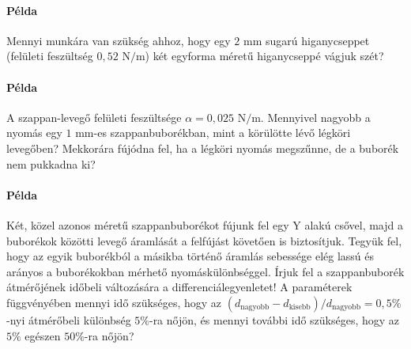 \documentclass[12pt,a4paper]{scrartcl}
\begin{document}
\paragraph{Példa}
Mennyi munkára van szükség ahhoz, hogy egy $2\text{ mm}$ sugarú higanycseppet (felületi feszültség $0{,}52\text{ N}/\text{m}$) két egyforma méretű higanycseppé vágjuk szét?

\paragraph{Példa}
A szappan-levegő felületi feszültsége $\alpha = 0{,}025\text{ N}/\text{m}$. Mennyivel nagyobb a nyomás egy $1\text{ mm}$-es szappanbuborékban, mint a körülötte lévő légköri levegőben? Mekkorára fújódna fel, ha a légköri nyomás megszűnne, de a buborék nem pukkadna ki?

\paragraph{Példa}
Két, közel azonos méretű szappanbuborékot fújunk fel egy Y alakú csővel, majd a buborékok közötti levegő áramlását a felfújást követően is biztosítjuk. Tegyük fel, hogy az egyik buborékból a másikba történő áramlás sebessége elég lassú és arányos a buborékokban mérhető nyomáskülönbséggel. Írjuk fel a szappanbuborék átmérőjének időbeli változására a differenciálegyenletet! A paraméterek függvényében mennyi idő szükséges, hogy az $\left( {{d_{{\text{nagyobb}}}} - {d_{{\text{kisebb}}}}} \right)/{d_{{\text{nagyobb}}}} = 0{,}5\%$-nyi átmérőbeli különbség $5\%$-ra nőjön, és mennyi további idő szükséges, hogy az $5\%$ egészen $50\%$-ra nőjön?
\normalsize
\end{document}
